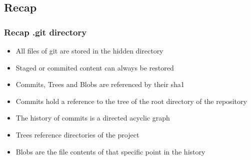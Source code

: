 \subsection{Recap}
\begin{frame}
    \frametitle{Recap .git directory}
    \begin{itemize}
        \item All files of git are stored in the hidden directory
        \item Staged or commited content can always be restored
        \item Commits, Trees and Blobs are referenced by their sha1\footnotemark
        \item Commits hold a reference to the tree of the root directory of the repository
        \item The history of commits is a directed acyclic graph\footnotemark
        \item Trees reference directories of the project
        \item Blobs are the file contents of that specific point in the history
    \end{itemize}
\end{frame}

